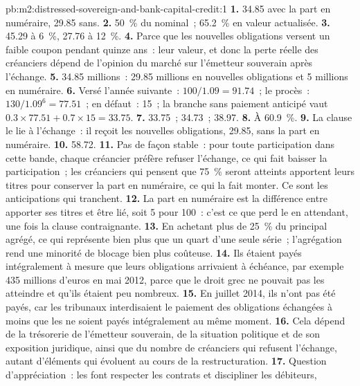 \begin{solution}{pb:m2:distressed-sovereign-and-bank-capital-credit:1}
\textbf{1.} 34.85 avec la part en numéraire, 29.85 sans.
\textbf{2.} 50~\% du nominal~; 65.2~\% en valeur actualisée.
\textbf{3.} 45.29 à 6~\%, 27.76 à 12~\%.
\textbf{4.} Parce que les nouvelles obligations versent un faible coupon pendant quinze ans~: leur valeur, et
donc la perte réelle des créanciers dépend de l'opinion du marché sur l'émetteur souverain après
l'échange.
\textbf{5.} 34.85 millions~: 29.85 millions en nouvelles obligations et 5 millions en numéraire.
\textbf{6.} Versé l'année suivante~: $100/1.09 = 91.74$~; le procès~: $130/1.09^6 = 77.51$~; en
défaut~: 15~; la branche sans paiement anticipé vaut $0.3 \times 77.51 + 0.7 \times
15 = 33.75$.
\textbf{7.} 33.75~; 34.73~; 38.97.
\textbf{8.} À 60.9~\%.
\textbf{9.} La clause le lie à l'échange~: il reçoit les nouvelles obligations, 29.85, sans
la part en numéraire.
\textbf{10.} 58.72.
\textbf{11.} Pas de façon stable~: pour toute participation dans cette bande, chaque créancier
préfère refuser l'échange, ce qui fait baisser la participation~; les créanciers qui pensent que 75~\% seront atteints apportent leurs titres pour
conserver la part en numéraire, ce qui la fait monter. Ce sont les anticipations qui tranchent.
\textbf{12.} La part en numéraire est la différence entre apporter ses titres et être lié, soit 5 pour 100~:
c'est ce que perd le  en attendant, une fois la clause contraignante.
\textbf{13.} En achetant plus de 25~\% du principal agrégé, ce qui représente bien plus que
un quart d'une seule série~; l'agrégation rend une minorité de blocage bien plus coûteuse.
\textbf{14.} Ils étaient payés intégralement à mesure que leurs obligations arrivaient à échéance, par exemple 435 millions d'euros en
mai 2012, parce que le droit grec ne pouvait pas les atteindre et qu'ils étaient peu nombreux.
\textbf{15.} En juillet 2014, ils n'ont pas été payés, car les tribunaux interdisaient le paiement des
obligations échangées à moins que les  ne soient payés intégralement au même moment.
\textbf{16.} Cela dépend de la trésorerie de l'émetteur souverain, de la situation politique et de son exposition
juridique, ainsi que du nombre de créanciers qui refusent l'échange, autant d'éléments qui évoluent au cours de la restructuration.
\textbf{17.} Question d'appréciation~: les  font respecter les contrats et discipliner les débiteurs,

\end{solution}
